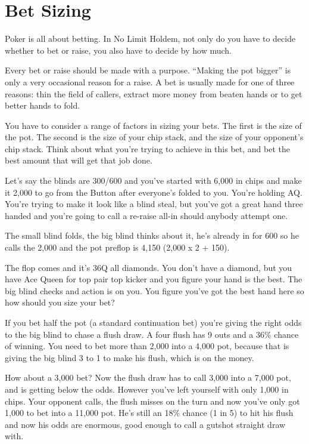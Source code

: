 \chapter{Bet Sizing}


Poker is all about betting. In No Limit Holdem, not only do you have to
decide whether to bet or raise, you also have to decide by how much.

Every bet or raise should be made with a purpose. ``Making the pot
bigger'' is only a very occasional reason for a raise. A bet
is usually made for one of three reasons: thin the field of callers,
extract more money from beaten hands or to get better hands to fold.

You have to consider a range of factors in sizing your bets. The first is
the size of the pot. The second is the size of your chip stack, and
the size of your opponent's chip stack. Think about
what you're trying to achieve in this bet, and bet the best amount
that will get that job done.

Let's say the blinds are 300/600 and you've started with 6,000 in chips
and make it 2,000 to go from the Button after everyone's folded to you.
You're holding AQ. You're trying to make it look like a blind steal, but
you've got a great hand three handed and you're going to call a re-raise
all-in should anybody attempt one.

The small blind folds, the big blind thinks about it, he's already in
for 600 so he calls the 2,000 and the pot preflop is 4,150 (2,000 x 2 + 150).

The flop comes and it's 36Q all diamonds. You don't have a diamond, but
you have Ace Queen for top pair top kicker and you figure your hand
is the best. The big blind checks and action is on you. You figure you've
got the best hand here so how should you size your bet?

If you bet half the pot (a standard continuation bet) you're giving the
right odds to the big blind to chase a flush draw. A four flush has 9 outs
and a 36\% chance of winning. You need to bet more than 2,000 into a 4,000 pot,
because that is giving the big blind 3 to 1 to make his flush, which is
on the money.

How about a 3,000 bet? Now the flush draw has to call 3,000 into a 7,000 pot,
and is getting below the odds. However you've left yourself with
only 1,000 in chips. Your opponent calls, the flush misses on the turn and
now you've only got 1,000 to bet into a 11,000 pot. He's still an 18\% chance
(1 in 5) to hit his flush and now his odds are enormous, good enough to
call a gutshot straight draw with.

